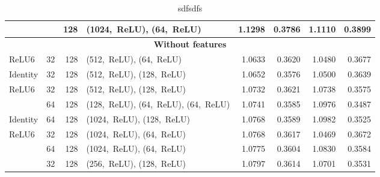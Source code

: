 \begin{table}
\begin{tabular}{lrr>{\raggedright\arraybackslash}p{3.6cm}rrrr}
           &    & 128 & (1024,~ReLU), (64,~ReLU) &  1.1298 &      0.3786 &   1.1110 &        0.3899 \\
           \midrule
\multicolumn{8}{c}{\textbf{Without features}}\\\addlinespace
ReLU6 & 32  & 128 & (512,~ReLU), (64,~ReLU) &  1.0633 &      0.3620 &   1.0480 &        0.3677 \\
Identity & 32  & 128 & (512,~ReLU), (128,~ReLU) &  1.0652 &      0.3576 &   1.0500 &        0.3639 \\
ReLU6 & 32  & 128 & (512,~ReLU), (128,~ReLU) &  1.0732 &      0.3621 &   1.0738 &        0.3575 \\
                 & 64  & 128 & (128,~ReLU), (64,~ReLU), (64,~ReLU) &  1.0741 &      0.3585 &   1.0976 &        0.3487 \\
Identity & 64  & 128 & (1024,~ReLU), (128,~ReLU) &  1.0768 &      0.3589 &   1.0982 &        0.3525 \\
ReLU6 & 32  & 128 & (1024,~ReLU), (64,~ReLU) &  1.0768 &      0.3617 &   1.0469 &        0.3672 \\
                 & 64  & 128 & (1024,~ReLU), (64,~ReLU) &  1.0775 &      0.3604 &   1.0830 &        0.3584 \\
                 & 32  & 128 & (256,~ReLU), (128,~ReLU) &  1.0797 &      0.3614 &   1.0701 &        0.3531 \\

\bottomrule
\end{tabular}
\caption{sdfsdfs}
\label{tab:results.nn}
\end{table}
